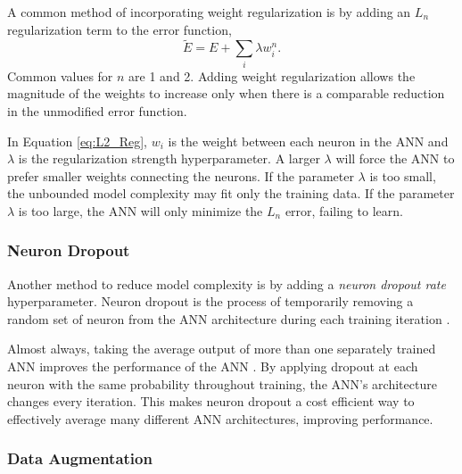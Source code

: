 A common method of incorporating weight regularization is by adding an $L_n$ regularization term to the error function, 
%
\begin{equation} \label{eq:L2_Reg}
\tilde{E} = E + \sum_i \lambda w_i^n.
\end{equation}
%
Common values for $n$ are 1 and 2. Adding weight regularization allows the magnitude of the weights to increase only when there is a comparable reduction in the unmodified error function.

In Equation \ref{eq:L2_Reg}, $w_i$ is the weight between each neuron in the ANN and $\lambda$ is the regularization strength hyperparameter. A larger $\lambda$ will force the ANN to prefer smaller weights connecting the neurons. If the parameter $\lambda$ is too small, the unbounded model complexity may fit only the training data. If the parameter $\lambda$ is too large, the ANN will only minimize the $L_n$ error, failing to learn.

\subsubsection{Neuron Dropout}

Another method to reduce model complexity is by adding a \textit{neuron dropout rate} hyperparameter. Neuron dropout is the process of temporarily removing a random set of neuron from the ANN architecture during each training iteration \cite{Srivastava2014}.

Almost always, taking the average output of more than one separately trained ANN improves the performance of the ANN \cite{Srivastava2014}. By applying dropout at each neuron with the same probability throughout training, the ANN's architecture changes every iteration. This makes neuron dropout a cost efficient way to effectively average many different ANN architectures, improving performance. 




\subsubsection{Data Augmentation}

